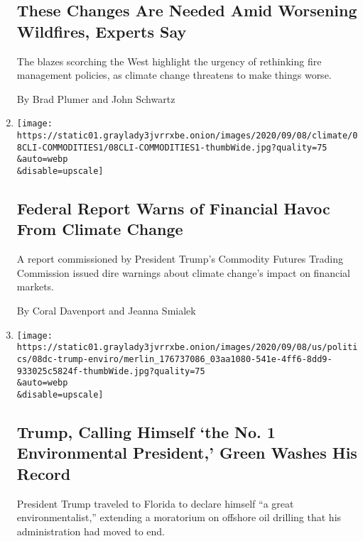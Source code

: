 \begin{enumerate}
  \hypertarget{these-changes-are-needed-amid-worsening-wildfires-experts-say}{%
  \subsection{These Changes Are Needed Amid Worsening Wildfires, Experts
  Say}\label{these-changes-are-needed-amid-worsening-wildfires-experts-say}}

  The blazes scorching the West highlight the urgency of rethinking fire
  management policies, as climate change threatens to make things worse.

  By Brad Plumer and John Schwartz
\item
  \href{/2020/09/08/climate/climate-change-financial-markets.html}{}

  \texttt{[image: https://static01.graylady3jvrrxbe.onion/images/2020/09/08/climate/08CLI-COMMODITIES1/08CLI-COMMODITIES1-thumbWide.jpg?quality=75\\\&auto=webp\\\&disable=upscale]}

  \hypertarget{federal-report-warns-of-financial-havoc-from-climate-change}{%
  \subsection{Federal Report Warns of Financial Havoc From Climate
  Change}\label{federal-report-warns-of-financial-havoc-from-climate-change}}

  A report commissioned by President Trump's Commodity Futures Trading
  Commission issued dire warnings about climate change's impact on
  financial markets.

  By Coral Davenport and Jeanna Smialek
\item
  \href{/2020/09/08/us/politics/trump-drilling-environment-florida.html}{}

  \texttt{[image: https://static01.graylady3jvrrxbe.onion/images/2020/09/08/us/politics/08dc-trump-enviro/merlin\_176737086\_03aa1080-541e-4ff6-8dd9-933025c5824f-thumbWide.jpg?quality=75\\\&auto=webp\\\&disable=upscale]}

  \hypertarget{trump-calling-himself-the-no-1-environmental-president-green-washes-his-record}{%
  \subsection{Trump, Calling Himself `the No. 1 Environmental
  President,' Green Washes His
  Record}\label{trump-calling-himself-the-no-1-environmental-president-green-washes-his-record}}

  President Trump traveled to Florida to declare himself ``a great
  environmentalist,'' extending a moratorium on offshore oil drilling
  that his administration had moved to end.


\end{enumerate}
